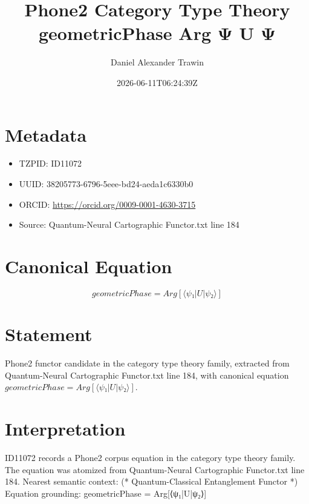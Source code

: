 \documentclass[11pt]{article}
\title{Phone2 Category Type Theory geometricPhase Arg Ψ U Ψ}
\author{Daniel Alexander Trawin}
\date{2026-06-11T06:24:39Z}
\begin{document}
\maketitle
\section*{Metadata}
\begin{itemize}
\item TZPID: ID11072
\item UUID: 38205773-6796-5eee-bd24-aeda1c6330b0
\item ORCID: \url{https://orcid.org/0009-0001-4630-3715}
\item Source: Quantum-Neural Cartographic Functor.txt line 184
\end{itemize}
\section*{Canonical Equation}
\[
geometricPhase = Arg[⟨ψ₁|U|ψ₂⟩]
\]
\section*{Statement}
Phone2 functor candidate in the category type theory family, extracted from Quantum-Neural Cartographic Functor.txt line 184, with canonical equation $geometricPhase = Arg[⟨ψ₁|U|ψ₂⟩]$.
\section*{Interpretation}
ID11072 records a Phone2 corpus equation in the category type theory family. The equation was atomized from Quantum-Neural Cartographic Functor.txt line 184. Nearest semantic context: (* Quantum-Classical Entanglement Functor *) Equation grounding: geometricPhase = Arg[⟨ψ₁|U|ψ₂⟩]
\end{document}

